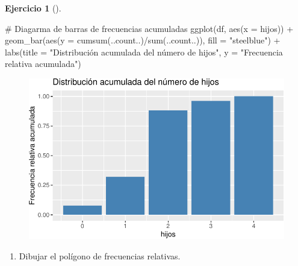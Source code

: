 \documentclass[
  a4paper,
]{scrreport}
\newenvironment{Shaded}{\begin{snugshade}}{\end{snugshade}}
\newcommand{\AttributeTok}[1]{\textcolor[rgb]{0.40,0.45,0.13}{#1}}
\newcommand{\CommentTok}[1]{\textcolor[rgb]{0.37,0.37,0.37}{#1}}
\newcommand{\FunctionTok}[1]{\textcolor[rgb]{0.28,0.35,0.67}{#1}}
\newcommand{\NormalTok}[1]{\textcolor[rgb]{0.00,0.23,0.31}{#1}}
\newcommand{\SpecialCharTok}[1]{\textcolor[rgb]{0.37,0.37,0.37}{#1}}
\newcommand{\StringTok}[1]{\textcolor[rgb]{0.13,0.47,0.30}{#1}}
\providecommand{\tightlist}{%
  \setlength{\itemsep}{0pt}\setlength{\parskip}{0pt}}\usepackage{longtable,booktabs,array}
\theoremstyle{definition}
\newtheorem{exercise}{Ejercicio}[chapter]
\theoremstyle{remark}
\begin{document}
\begin{exercise}[]
\begin{tcolorbox}
\begin{figure}[H]
{}

\end{figure}

\begin{Shaded}
\begin{Highlighting}[]
\CommentTok{\# Diagarma de barras de frecuencias acumuladas}
\FunctionTok{ggplot}\NormalTok{(df, }\FunctionTok{aes}\NormalTok{(}\AttributeTok{x =}\NormalTok{ hijos)) }\SpecialCharTok{+}
    \FunctionTok{geom\_bar}\NormalTok{(}\FunctionTok{aes}\NormalTok{(}\AttributeTok{y =} \FunctionTok{cumsum}\NormalTok{(..count..)}\SpecialCharTok{/}\FunctionTok{sum}\NormalTok{(..count..)), }\AttributeTok{fill =} \StringTok{"steelblue"}\NormalTok{) }\SpecialCharTok{+}
    \FunctionTok{labs}\NormalTok{(}\AttributeTok{title =} \StringTok{"Distribución acumulada del número de hijos"}\NormalTok{, }\AttributeTok{y =} \StringTok{"Frecuencia relativa acumulada"}\NormalTok{)}
\end{Highlighting}
\end{Shaded}

\begin{figure}[H]

{\centering \includegraphics{./03-frecuencias-graficos_files/figure-pdf/unnamed-chunk-7-4.pdf}

}

\end{figure}

\end{tcolorbox}

\begin{enumerate}
\def\labelenumi{\alph{enumi}.}
\setcounter{enumi}{3}
\tightlist
\item
  Dibujar el polígono de frecuencias relativas.
\end{enumerate}


\end{exercise}
\end{document}
